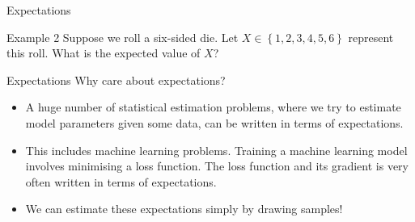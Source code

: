 \documentclass[10pt]{beamer}
\begin{document}
\begin{frame}[fragile]{Expectations}
\begin{exampleblock}{Example 2}
Suppose we roll a six-sided die. Let \(X \in \left\{1, 2, 3, 4, 5, 6\right\}\) represent this roll. What is the expected value of \(X\)?


\end{exampleblock}
\end{frame}

\begin{frame}[fragile]{Expectations}
Why care about expectations?
\begin{itemize}[<+->]
    \item A huge number of statistical estimation problems, where we try to estimate model parameters given some data, can be written in terms of expectations.
    \item This includes machine learning problems. Training a machine learning model involves minimising a loss function. The loss function and its gradient is very often written in terms of expectations.
    \item We can estimate these expectations simply by drawing samples!
\end{itemize}
\end{frame}

    
\end{document}
